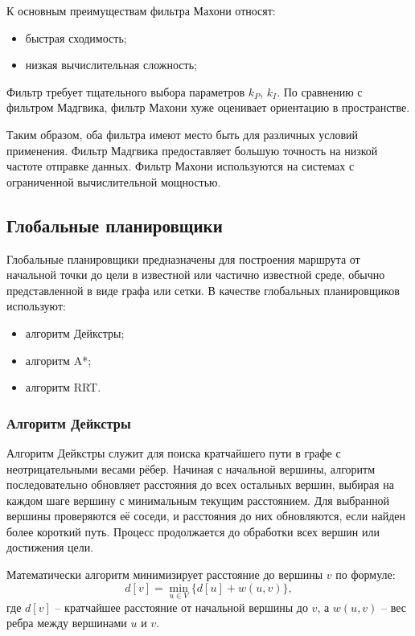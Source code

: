 К основным преимуществам фильтра Махони относят:
\begin{itemize}
	\item быстрая сходимость;
	\item низкая вычислительная сложность;
\end{itemize}

Фильтр требует тщательного выбора параметров \(k_P\), \(k_I\). По сравнению с фильтром Мадгвика, 
фильтр Махони хуже оценивает ориентацию в пространстве.


Таким образом, оба фильтра имеют место быть для различных условий применения.
Фильтр Мадгвика предоставляет большую точность на низкой частоте отправке данных.
Фильтр Махони используются на системах с ограниченной вычислительной мощностью.

\subsection{Глобальные планировщики}
Глобальные планировщики предназначены для построения маршрута от начальной точки до цели
в известной или частично известной среде, обычно представленной в виде графа или сетки.
В качестве глобальных планировщиков используют:
\begin{itemize}
	\item алгоритм Дейкстры;
	\item алгоритм A*;
	\item алгоритм RRT.
\end{itemize}

\subsubsection{Алгоритм Дейкстры}
\hfill

Алгоритм Дейкстры служит для поиска кратчайшего пути в графе с неотрицательными весами рёбер.
Начиная с начальной вершины, алгоритм последовательно обновляет расстояния до всех остальных вершин,
выбирая на каждом шаге вершину с минимальным текущим расстоянием.
Для выбранной вершины проверяются её соседи, и расстояния до них обновляются,
если найден более короткий путь.
Процесс продолжается до обработки всех вершин или достижения цели.

Математически алгоритм минимизирует расстояние до вершины $v$ по формуле:
\begin{equation}
d[v] = \min_{u \in V} \{ d[u] + w(u, v) \},
\end{equation}
где $d[v]$ -- кратчайшее расстояние от начальной вершины до $v$,
а $w(u, v)$ -- вес ребра между вершинами $u$ и $v$.

